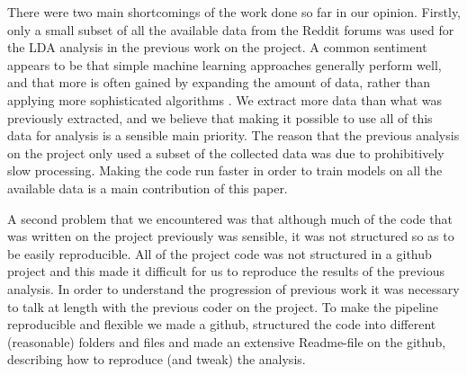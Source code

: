 \documentclass{article}
\begin{document}
There were two main shortcomings of the work done so far in our opinion. Firstly, only a small subset of all the available data from the Reddit forums was used for the LDA analysis in the previous work on the project. A common sentiment appears to be that simple machine learning approaches generally perform well, and that more is often gained by expanding the amount of data, rather than applying more sophisticated algorithms \cite{domingos2012few}. We extract more data than what was previously extracted, and we believe that making it possible to use all of this data for analysis is a sensible main priority. The reason that the previous analysis on the project only used a subset of the collected data was due to prohibitively slow processing. Making the code run faster in order to train models on all the available data is a main contribution of this paper. 

A second problem that we encountered was that although much of the code that was written on the project previously was sensible, it was not structured so as to be easily reproducible. All of the project code was not structured in a github project and this made it difficult for us to reproduce the results of the previous analysis. In order to understand the progression of previous work it was necessary to talk at length with the previous coder on the project. To make the pipeline reproducible and flexible we made a github, structured the code into different (reasonable) folders and files and made an extensive Readme-file on the github, describing how to reproduce (and tweak) the analysis.
\end{document}
